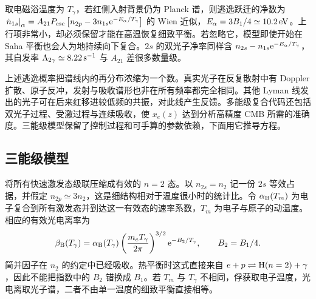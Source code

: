 取电磁浴温度为 $T_\gamma$，若红侧入射背景仍为 Planck 谱，则逃逸跃迁的净数为 $\left.\dot n_{1s}\right|_\alpha =\allowbreak{}A_{21}P_{\rm esc}\left[n_{2p}-3n_{1s}\mathrm{e}^{-E_\alpha/T_\gamma}\right]$
的 Wien 近似，$E_\alpha=3B_1/4\simeq10.2\,{\rm eV}$。上行项非常小，却必须保留才能在高温恢复细致平衡。若忽略它，模型即使开始在 Saha 平衡也会人为地持续向下复合。$2s$ 的双光子净率同样含 $n_{2s}-n_{1s}\mathrm{e}^{-E_\alpha/T_\gamma}$，其自发率 $\Lambda_{2\gamma}\simeq8.22\,{\rm s}^{-1}$ 与 $A_{21}$ 差很多数量级。

上述逃逸概率把谱线内的再分布浓缩为一个数。真实光子在反复散射中有 Doppler 扩散、原子反冲，发射与吸收谱形也非在所有频率都完全相同。其他 Lyman 线发出的光子可在后来红移进较低频的共振，对此线产生反馈。多能级复合代码还包括双光子过程、受激过程与连续吸收，使 $x_e(z)$ 达到分析高精度 CMB 所需的准确度。三能级模型保留了控制过程和可手算的参数依赖，下面用它推导方程。

\subsection{三能级模型}

将所有快速激发态级联压缩成有效的 $n=2$ 态。以 $n_{2s}=n_2$ 记一份 $2s$ 等效占据，并假定 $n_{2p}\simeq3n_2$，这是细结构相对于温度很小时的统计比。令 $\alpha_{\rm B}(T_m)$ 为电子复合到所有激发态并到达这一有效态的速率系数，$T_m$ 为电子与原子的动温度。相应的有效光电离率为
\[
 \beta_{\rm B}(T_\gamma)=\alpha_{\rm B}(T_\gamma)
 \left(\frac{m_eT_\gamma}{2\pi}\right)^{3/2}
 \mathrm{e}^{-B_2/T_\gamma},\qquad B_2=B_1/4 .
\]
简并因子在 $n_2$ 的约定中已经吸收。热平衡时这式直接来自 $e+p\rightleftharpoons{\rm H}(n=2)+\gamma$，因此不能把指数中的 $B_2$ 错换成 $B_1$。若 $T_m$ 与 $T_\gamma$ 不相同，俘获取电子温度，光电离取光子谱，二者不由单一温度的细致平衡直接相等。


